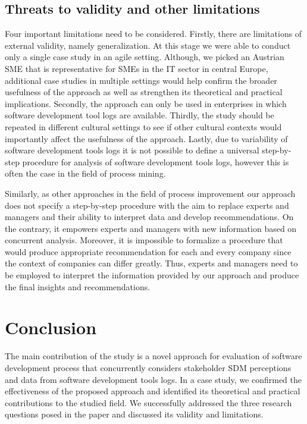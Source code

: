 \subsection{Threats to validity and other limitations}

Four important limitations need to be considered. Firstly, there are limitations of external validity, namely generalization. At this stage we were able to conduct only a single case study in an agile setting. Although, we picked an Austrian SME that is representative for SMEs in the IT sector in central Europe, additional case studies in multiple settings would help confirm the broader usefulness of the approach as well as strengthen its theoretical and practical implications. Secondly, the approach can only be used in enterprises in which software development tool logs are available. Thirdly, the study should be repeated in different cultural settings to see if other cultural contexts would importantly affect the usefulness of the approach. Lastly, due to variability of software development tools logs it is not possible to define a universal step-by-step procedure for analysis of software development tools logs, however this is often the case in the field of process mining.

Similarly, as other approaches in the field of process improvement \citep{Zellner2011} our approach does not specify a step-by-step procedure with the aim to replace experts and managers and their ability to interpret data and develop recommendations. On the contrary, it empowers experts and managers with new information based on concurrent analysis. Moreover, it is impossible to formalize a procedure that would produce appropriate recommendation for each and every company since the context of companies can differ greatly. Thus, experts and managers need to be employed to interpret the information provided by our approach and produce the final insights and recommendations. 


\section{Conclusion}

The main contribution of the study is a novel approach for evaluation of software development process that concurrently considers stakeholder SDM perceptions and data from software development tools logs. In a case study, we confirmed the effectiveness of the proposed approach and identified its theoretical and practical contributions to the studied field. We successfully addressed the three research questions posed in the paper and discussed its validity and limitations. 

